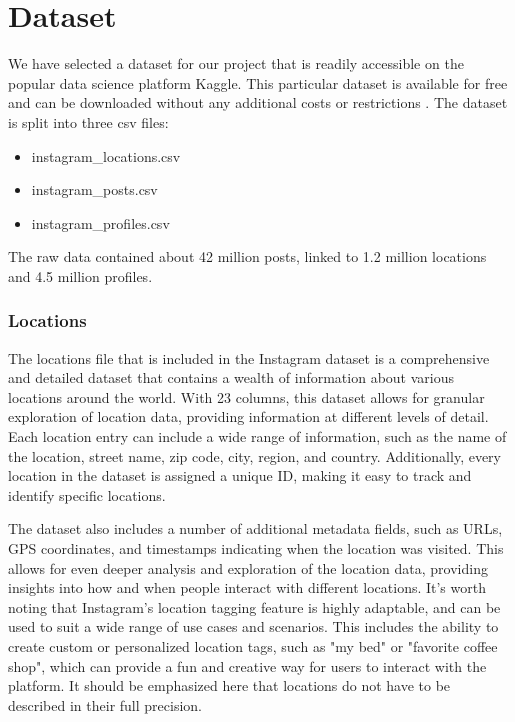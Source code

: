\documentclass[conference]{IEEEtran}
\begin{document}
\section{Dataset}
We have selected a dataset for our project that is readily accessible on the popular data science platform Kaggle. This particular dataset is available for free and can be downloaded without any additional costs or restrictions \cite{shmalex-instagram-dataset}. The dataset is split into three csv files: 
\begin{itemize}
    \item instagram\_locations.csv
    \item instagram\_posts.csv
    \item instagram\_profiles.csv
\end{itemize}
The raw data contained about 42 million posts, linked to 1.2 million locations and 4.5 million profiles.
\\
\subsubsection{Locations}
The locations file that is included in the Instagram dataset is a comprehensive and detailed dataset that contains a wealth of information about various locations around the world. With 23 columns, this dataset allows for granular exploration of location data, providing information at different levels of detail. Each location entry can include a wide range of information, such as the name of the location, street name, zip code, city, region, and country. Additionally, every location in the dataset is assigned a unique ID, making it easy to track and identify specific locations.

The dataset also includes a number of additional metadata fields, such as URLs, GPS coordinates, and timestamps indicating when the location was visited. This allows for even deeper analysis and exploration of the location data, providing insights into how and when people interact with different locations. It's worth noting that Instagram's location tagging feature is highly adaptable, and can be used to suit a wide range of use cases and scenarios. This includes the ability to create custom or personalized location tags, such as "my bed" or "favorite coffee shop", which can provide a fun and creative way for users to interact with the platform. It should be emphasized here that locations do not have to be described in their full precision.
\\
\end{document}

